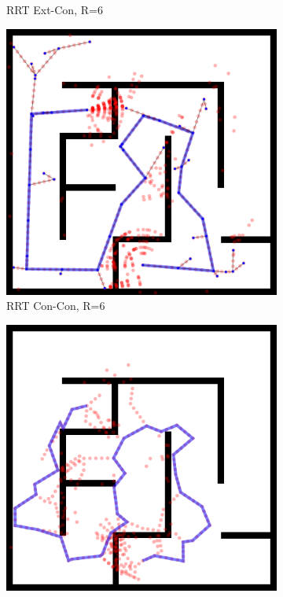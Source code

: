 \begin{figure}
\begin{subfigure}[b]{0.3\textwidth}
      \caption{RRT Ext-Con, R=6}
   \end{subfigure}%
   \quad
   \begin{subfigure}[b]{0.3\textwidth}
      \includegraphics[width=\textwidth]{figs/compare-2d-rrtc1-rrtconcon-r6-s1.png}
      \caption{RRT Con-Con, R=6}
   \end{subfigure}%
   \quad
   \begin{subfigure}[b]{0.3\textwidth}
      \includegraphics[width=\textwidth]{figs/compare-2d-rrtc1-checkmask-l10-s1.png}

\end{subfigure}
\end{figure}
